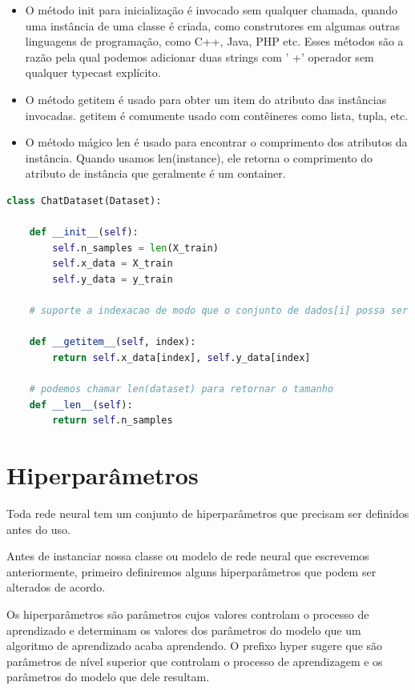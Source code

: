 \begin{itemize}
   \item O método init para inicialização é invocado sem qualquer chamada, quando uma instância de uma classe é criada, como construtores em algumas outras linguagens de programação, como C++, Java, PHP etc. Esses métodos são a razão pela qual podemos adicionar duas strings com ' +' operador sem qualquer typecast explícito.
   \item O método getitem é usado para obter um item do atributo das instâncias invocadas. getitem é comumente usado com contêineres como lista, tupla, etc.
   \item O método mágico len é usado para encontrar o comprimento dos atributos da instância. Quando usamos len(instance), ele retorna o comprimento do atributo de instância que geralmente é um container.
\end{itemize}

\begin{lstlisting}[language=Python, caption=Dataset]
class ChatDataset(Dataset):

    def __init__(self):
        self.n_samples = len(X_train)
        self.x_data = X_train
        self.y_data = y_train

    # suporte a indexacao de modo que o conjunto de dados[i] possa ser usado para obter a i-esima amostra

    def __getitem__(self, index):
        return self.x_data[index], self.y_data[index]

    # podemos chamar len(dataset) para retornar o tamanho
    def __len__(self):
        return self.n_samples

\end{lstlisting}


\section[Hiperparâmetros]{Hiperparâmetros}
Toda rede neural tem um conjunto de hiperparâmetros que precisam ser definidos antes do uso.

Antes de instanciar nossa classe ou modelo de rede neural que escrevemos anteriormente, primeiro definiremos alguns hiperparâmetros que podem ser alterados de acordo.

Os hiperparâmetros são parâmetros cujos valores controlam o processo de aprendizado e determinam os valores dos parâmetros do modelo que um algoritmo de aprendizado acaba aprendendo. O prefixo hyper sugere que são parâmetros de nível superior que controlam o processo de aprendizagem e os parâmetros do modelo que dele resultam.

